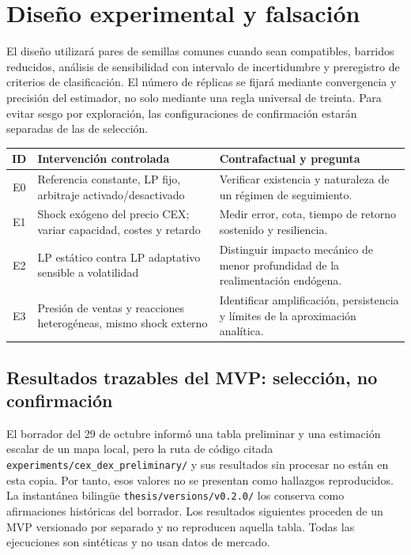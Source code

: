 \section{Diseño experimental y falsación}

El diseño utilizará pares de semillas comunes cuando sean compatibles, barridos
reducidos, análisis de sensibilidad con intervalo de incertidumbre y preregistro de
criterios de clasificación. El número de réplicas se fijará mediante convergencia y
precisión del estimador, no solo mediante una regla universal de treinta. Para evitar
sesgo por exploración, las configuraciones de confirmación estarán separadas de las
de selección.

\begin{table}[!ht]
\centering
\small
\begin{tabularx}{\textwidth}{@{}c p{4.2cm} X@{}}
\toprule
\textbf{ID} & \textbf{Intervención controlada} & \textbf{Contrafactual y pregunta} \\
\midrule
E0 & Referencia constante, LP fijo, arbitraje activado/desactivado & Verificar existencia
  y naturaleza de un régimen de seguimiento. \\
E1 & Shock exógeno del precio CEX; variar capacidad, costes y retardo & Medir error, cota,
  tiempo de retorno sostenido y resiliencia. \\
E2 & LP estático contra LP adaptativo sensible a volatilidad & Distinguir impacto mecánico
  de menor profundidad de la realimentación endógena. \\
E3 & Presión de ventas y reacciones heterogéneas, mismo shock externo & Identificar
  amplificación, persistencia y límites de la aproximación analítica. \\
\bottomrule
\end{tabularx}
\end{table}

\subsection{Resultados trazables del MVP: selección, no confirmación}

El borrador del 29 de octubre informó una tabla preliminar y una estimación escalar de
un mapa local, pero la ruta de código citada
\texttt{experiments/cex\_dex\_preliminary/} y sus resultados sin procesar no están en
esta copia. Por tanto, esos valores no se presentan como hallazgos reproducidos. La
instantánea bilingüe \texttt{thesis/versions/v0.2.0/} los conserva como afirmaciones
históricas del borrador. Los resultados siguientes proceden de un MVP versionado por
separado y no reproducen aquella tabla. Todas las ejecuciones son sintéticas y no usan
datos de mercado.


